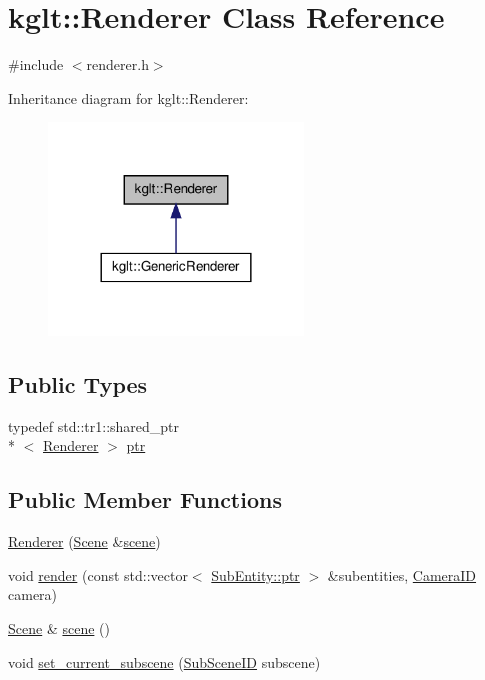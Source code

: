 \hypertarget{classkglt_1_1_renderer}{\section{kglt\-:\-:Renderer Class Reference}
\label{classkglt_1_1_renderer}
}


{\ttfamily \#include $<$renderer.\-h$>$}



Inheritance diagram for kglt\-:\-:Renderer\-:\nopagebreak
\begin{figure}[H]
\begin{center}
\leavevmode
\includegraphics[width=192pt]{classkglt_1_1_renderer__inherit__graph}
\end{center}
\end{figure}
\subsection*{Public Types}
\begin{DoxyCompactItemize}
\item 
typedef std\-::tr1\-::shared\-\_\-ptr\\*
$<$ \hyperlink{classkglt_1_1_renderer}{Renderer} $>$ \hyperlink{classkglt_1_1_renderer_a6e6ebee8ca27407c5bd7103ea325c930}{ptr}
\end{DoxyCompactItemize}
\subsection*{Public Member Functions}
\begin{DoxyCompactItemize}
\item 
\hyperlink{classkglt_1_1_renderer_ada5d39e9738d14fb4ca484cd73dc293b}{Renderer} (\hyperlink{classkglt_1_1_scene}{Scene} \&\hyperlink{classkglt_1_1_renderer_a53eeb595f09f1332539a9301a5c0d988}{scene})
\item 
void \hyperlink{classkglt_1_1_renderer_a3cd6462e026d0936f697023e33f609ec}{render} (const std\-::vector$<$ \hyperlink{class_managed_a59aa857eaf753735f65130812e98e9a9}{Sub\-Entity\-::ptr} $>$ \&subentities, \hyperlink{namespacekglt_a2a2b79f136b052b58ec737bd9c885429}{Camera\-I\-D} camera)
\item 
\hyperlink{classkglt_1_1_scene}{Scene} \& \hyperlink{classkglt_1_1_renderer_a53eeb595f09f1332539a9301a5c0d988}{scene} ()
\item 
void \hyperlink{classkglt_1_1_renderer_ab2aa33e07083872a124a4408cfd15073}{set\-\_\-current\-\_\-subscene} (\hyperlink{namespacekglt_a36b738e02745f47c81d1c9991fdc6237}{Sub\-Scene\-I\-D} subscene)
\end{DoxyCompactItemize}
